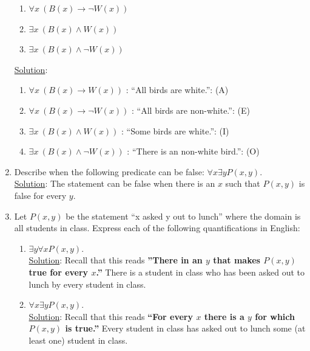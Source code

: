 \documentclass[12pt]{article}
\begin{document}
\begin{enumerate}
\begin{enumerate}
\item $\forall x~(B(x) \rightarrow \neg W(x))$ 


\item $\exists x~(B(x) \wedge W(x))$ 


\item $\exists x~(B(x) \wedge \neg W(x))$ 
\end{enumerate}

\noindent \underline{Solution}: \\

\begin{enumerate}
\item $\forall x~(B(x) \rightarrow W(x))$ : ``All birds are white.'': (A)
\item $\forall x~(B(x) \rightarrow \neg W(x))$ : ``All birds are non-white.'': (E)
\item $\exists x~(B(x) \wedge W(x))$ : ``Some birds are white.'': (I)
\item $\exists x~(B(x) \wedge \neg W(x))$ : ``There is an non-white bird.'': (O)
\end{enumerate}


\item Describe when the following predicate can be false: $\forall x \exists y P(x, y)$.\\

\noindent \underline{Solution}: The statement can be false when there is an $x$ such that $P(x, y)$ is false for every $y$.



\item Let $P(x, y)$ be the statement ``x asked y out to lunch'' where the domain is all students in class. Express each of the following quantifications in English:

\begin{enumerate}
\item $\exists y \forall x P(x, y)$.\\

\noindent \underline{Solution}: Recall that this reads \textbf{''There in an $y$ that makes $P(x, y)$ true for every $x$.''} There is a student in class who has been asked out to lunch by every student in class.\\

\item $\forall x \exists y P(x, y)$.\\

\noindent \underline{Solution}: Recall that this reads \textbf{``For every $x$ there is a $y$ for which $P(x, y)$ is true.''} Every student in class has asked out to lunch some (at least one) student in class.
\end{enumerate}


\end{enumerate}
\end{document}
